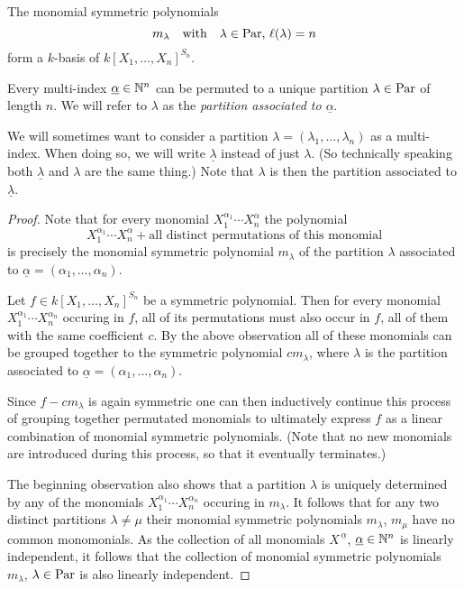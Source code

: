 \begin{proposition}
  \label{proposition: m_lambda give a basis}
  The monomial symmetric polynomials
  \[
      m_\lambda
    \quad\text{with}\quad
      \lambda \in \operatorname{Par}, \,
      \ell(\lambda) = n
  \]
  form a $k$-basis of $k[X_1, \dotsc, X_n]^{S_n}$.
\end{proposition}




\begin{notation}
  Every multi-index $\underline{\alpha} \in \mathbb{N}^n$ can be permuted to a unique partition $\lambda \in \operatorname{Par}$ of length $n$.
  We will refer to $\lambda$ as the \emph{partition associated to $\underline{\alpha}$}.
  
  We will sometimes want to consider a partition $\lambda = (\lambda_1, \dotsc, \lambda_n)$ as a multi-index.
  When doing so, we will write $\underline{\lambda}$ instead of just $\lambda$.
  (So technically speaking both $\underline{\lambda}$ and $\lambda$ are the same thing.)
  Note that $\lambda$ is then the partition associated to $\underline{\lambda}$.
\end{notation}


\begin{proof}
  Note that for every monomial $X_1^{\alpha_1} \dotsm X_n^{\alpha}$ the polynomial
  \[
      X_1^{\alpha_1} \dotsm X_n^{\alpha}
    + \text{all distinct permutations of this monomial}
  \]
  is precisely the monomial symmetric polynomial $m_\lambda$  of the partition $\lambda$ associated to $\underline{\alpha} = (\alpha_1, \dotsc, \alpha_n)$.
  
  Let $f \in k[X_1, \dotsc, X_n]^{S_n}$ be a symmetric polynomial.
  Then for every monomial $X_1^{\alpha_1} \dotsm X_n^{\alpha_n}$ occuring in $f$, all of its permutations must also occur in $f$, all of them with the same coefficient $c$.
  By the above observation all of these monomials can be grouped together to the symmetric polynomial $c m_{\lambda}$, where $\lambda$ is the partition associated to $\underline{\alpha} = (\alpha_1, \dotsc, \alpha_n)$.
  
  Since $f - c m_\lambda$ is again symmetric one can then inductively continue this process of grouping together permutated monomials to ultimately express $f$ as a linear combination of monomial symmetric polynomials.
  (Note that no new monomials are introduced during this process, so that it eventually terminates.)
  
  The beginning observation also shows that a partition $\lambda$ is uniquely determined by any of the monomials $X_1^{\alpha_1} \dotsm X_n^{\alpha_n}$ occuring in $m_\lambda$.
  It follows that for any two distinct partitions $\lambda \neq \mu$ their monomial symmetric polynomials $m_\lambda$, $m_\mu$ have no common monomonials.
  As the collection of all monomials $X^{\,\underline{\alpha}}$, $\underline{\alpha} \in \mathbb{N}^n$ is linearly independent, it follows that the collection of monomial symmetric polynomials $m_\lambda$, $\lambda \in \operatorname{Par}$ is also linearly independent.
\end{proof}



